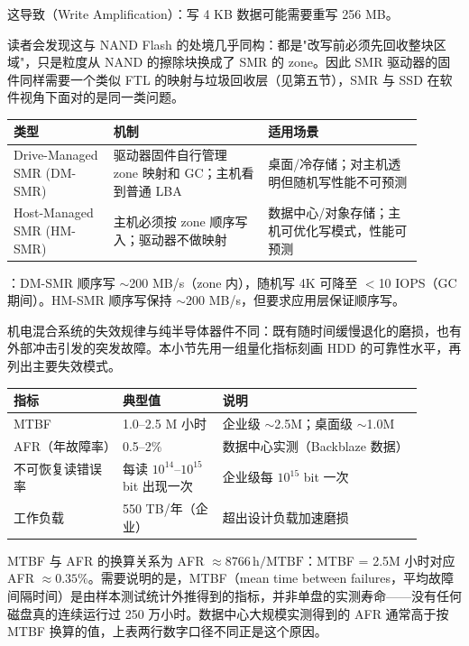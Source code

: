 这导致（Write Amplification）：写 4 KB 数据可能需要重写 256 MB。

读者会发现这与 NAND Flash 的处境几乎同构：都是"改写前必须先回收整块区域"，只是粒度从 NAND 的擦除块换成了 SMR 的 zone。因此 SMR 驱动器的固件同样需要一个类似 FTL 的映射与垃圾回收层（见第五节），SMR 与 SSD 在软件视角下面对的是同一类问题。

\begin{longtable}{L{0.22\linewidth}L{0.34\linewidth}L{0.34\linewidth}}
\toprule
类型 & 机制 & 适用场景 \\
\midrule
Drive-Managed SMR (DM-SMR) & 驱动器固件自行管理 zone 映射和 GC；主机看到普通 LBA & 桌面/冷存储；对主机透明但随机写性能不可预测 \\
Host-Managed SMR (HM-SMR) & 主机必须按 zone 顺序写入；驱动器不做映射 & 数据中心/对象存储；主机可优化写模式，性能可预测 \\
\bottomrule
\end{longtable}

：DM-SMR 顺序写 $\sim$200 MB/s（zone 内），随机写 4K 可降至 $<$10 IOPS（GC 期间）。HM-SMR 顺序写保持 $\sim$200 MB/s，但要求应用层保证顺序写。


机电混合系统的失效规律与纯半导体器件不同：既有随时间缓慢退化的磨损，也有外部冲击引发的突发故障。本小节先用一组量化指标刻画 HDD 的可靠性水平，再列出主要失效模式。

\begin{longtable}{L{0.24\linewidth}L{0.22\linewidth}L{0.44\linewidth}}
\toprule
指标 & 典型值 & 说明 \\
\midrule
MTBF & 1.0--2.5 M 小时 & 企业级 $\sim$2.5M；桌面级 $\sim$1.0M \\
AFR（年故障率） & 0.5--2\% & 数据中心实测（Backblaze 数据） \\
不可恢复读错误率 & 每读 $10^{14}$--$10^{15}$ bit 出现一次 & 企业级每 $10^{15}$ bit 一次 \\
工作负载 & 550 TB/年（企业） & 超出设计负载加速磨损 \\
\bottomrule
\end{longtable}

MTBF 与 AFR 的换算关系为 AFR $\approx 8766\,\mathrm{h} / \mathrm{MTBF}$：MTBF = 2.5M 小时对应 AFR $\approx 0.35\%$。需要说明的是，MTBF（mean time between failures，平均故障间隔时间）是由样本测试统计外推得到的指标，并非单盘的实测寿命——没有任何磁盘真的连续运行过 250 万小时。数据中心大规模实测得到的 AFR 通常高于按 MTBF 换算的值，上表两行数字口径不同正是这个原因。

